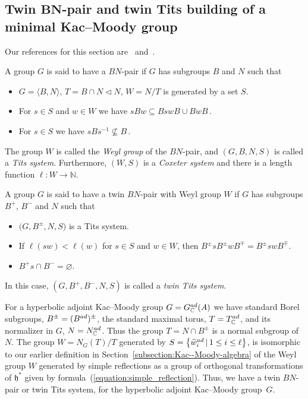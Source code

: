 \documentclass[11pt]{article}
\numberwithin{equation}{section}
\numberwithin{equation}{section}
\def\C{{\mathbb C}}
\def\N{\mathbb{N}}
\def\wtil{\widetilde w}
\def\la{\langle}
\def\ra{\rangle}
\def\h{\mathfrak{h}}
\begin{document}
\subsection[Twin $BN$-pair and twin Tits building of a minimal Kac--Moody group]{Twin $\boldsymbol{BN}$-pair and twin Tits building of a minimal Kac--Moody group}\label{subsection:BNpair_Tits_building}

Our references for this section are~\cite[Sections 6.2 and 6.3]{AbramenkoBrown08} and~\cite[Chapters~5 and~11]{Ronan89}.
\begin{Definition}[BN-pair]\label{definition:BN-pair} A group $G$ is said to have a $BN$-pair if $G$ has subgroups $B$ and $N$ such that
\begin{itemize}\itemsep=0pt
\item[T1:] $G=\la B,N\ra$, $T = B\cap N \lhd N$, $W = N/T$ is generated by a set $S$.
\item[T2:] For $s\in S$ and $w\in W$ we have $sB w\subseteq B s wB \cup B wB\,$.
\item[T3:] For $s\in S$ we have $sB s^{-1}\not\subseteq B\,$.
\end{itemize}
The group $W$ is called the {\it Weyl group} of the $BN$-pair, and $(G,B,N,S)$ is called a {\it Tits system}. Furthermore, $(W,S)$ is a {\it Coxeter system} and there is a length function $\ell\colon W\to\N$.
\end{Definition}
\begin{Definition} \label{definition:Twin-BN-pair}
A group $G$ is said to have a twin $BN$-pair with Weyl group $W$ if $G$ has subgroups $B^+$, $B^-$ and $N$ such that
\begin{itemize}\itemsep=0pt
\item[TW1:] $\big(G,B^\pm,N,S\big)$ is a Tits system.
\item[TW2:] If $\ell(sw) < \ell(w)$ for $s\in S$ and $w\in W$, then $B^\pm s B^\pm w B^\mp = B^\pm sw B^\mp$.
\item[TW3:] $B^+ s \cap B^- = \varnothing$.
\end{itemize}
In this case, $(G,B^+,B^-,N,S)$ is called a {\it twin Tits system}.
\end{Definition}

For a hyperbolic adjoint Kac--Moody group $G = G^{\rm ad}_\C(A)$ we have standard Borel subgroups,
$B^{\pm} = (B^{\rm ad})^\pm$, the standard maximal torus, $T = T^{\rm ad}_\C$, and its normalizer in $G$,
$N = N_\C^{\rm ad}$. Thus the group $T = N\cap B^{\pm}$ is a normal subgroup of $N$.
The group $W = N_G(T)/T$ generated by $S = \big\{\wtil^{\rm ad}_i\,|\, 1\leq i\leq\ell\big\}$, is isomorphic to our
earlier definition in Section~\ref{subsection:Kac--Moody-algebra}
of the Weyl group $W$ generated by simple reflections as a group of orthogonal transformations of $\h^*$ given by formula~(\ref{equation:simple_reflection}). Thus, we have a twin $BN$-pair or twin Tits system, for the hyperbolic adjoint Kac--Moody group~$G$.
\end{document}
